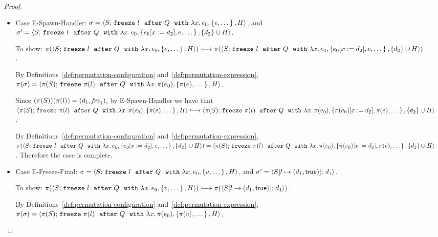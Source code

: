\begin{proof}
\begin{itemize}
    \item Case {\sc E-Spawn-Handler}: $\sigma =
      \langle S;\, \mbox{\texttt{freeze}}~l~~{\mbox{\texttt{after}}}~Q~~{\mbox{\texttt{with}}}~\lambda x.\,e_0, \left\{e,
            \dots\right\}, H \rangle$, and $\sigma' =
      \langle S;\, \mbox{\texttt{freeze}}~l~~{\mbox{\texttt{after}}}~Q~~{\mbox{\texttt{with}}}~\lambda x.\,e_0, \left\{e_0[x := d_2],
            e, \dots\right\}, \{d_2\}\cup H \rangle$.

      To show:
      $\pi(\config{S}{\freezeafterfull{l}{Q}{\lam{x}{e_0}}{\setof{e,
            \dots}}{H}}) \parstepsto
      \pi(\config{S}{\freezeafterfull{l}{Q}{\lam{x}{e_0}}{\setof{\subst{e_0}{x}{d_2},
            e, \dots}} {\{d_2\}\cup H}})$.

      By Definitions~\ref{def:permutation-configuration}
      and~\ref{def:permutation-expression}, $\pi(\sigma) =
      \langle \pi(S);\, \mbox{\texttt{freeze}}~\pi(l)~~{\mbox{\texttt{after}}}~Q~~{\mbox{\texttt{with}}}~\lambda x.\,\pi(e_0), \left\{\pi(e),
            \dots\right\}, H \rangle$.

      Since $(\pi(S))(\pi(l)) = (d_1, \mathit{frz}_1)$, by {\sc
        E-Spawn-Handler} we have that
      $\config{\pi(S)}{\freezeafterfull{\pi(l)}{Q}{\lam{x}{\pi(e_0)}}{\setof{\pi(e),
            \dots}}{H}} \parstepsto
      \config{\pi(S)}{\freezeafterfull{\pi(l)}{Q}{\lam{x}{\pi(e_0)}}{\setof{\subst{\pi(e_0)}{x}{d_2},
            \pi(e), \dots}} {\{d_2\}\cup H}}$.

      By Definitions~\ref{def:permutation-configuration}
      and~\ref{def:permutation-expression},
      $\pi(\langle S;\, \mbox{\texttt{freeze}}~l~~{\mbox{\texttt{after}}}~Q~~{\mbox{\texttt{with}}}~\lambda x.\,e_0, \left\{e_0[x := d_2],
            e, \dots\right\}, \{d_2\}\cup H \rangle) =
      \langle \pi(S);\, \mbox{\texttt{freeze}}~\pi(l)~~{\mbox{\texttt{after}}}~Q~~{\mbox{\texttt{with}}}~\lambda x.\,\pi(e_0), \left\{\pi(e_0)[x := d_2],
            \pi(e), \dots\right\}, \{d_2\}\cup H \rangle$.  Therefore the case is
      complete.

    \item Case {\sc E-Freeze-Final}: $\sigma =
      \langle S;\, \mbox{\texttt{freeze}}~l~~{\mbox{\texttt{after}}}~Q~~{\mbox{\texttt{with}}}~\lambda x.\,e_0, \left\{v,
            \dots\right\}, H \rangle$, and $\sigma' =
      \langle S[l \mapsto (d_1, \textsf{true})];\, d_1 \rangle$.

      To show:
      $\pi(\config{S}{\freezeafterfull{l}{Q}{\lam{x}{e_0}}{\setof{v,
            \dots}}{H}}) \parstepsto
      \pi(\config{\extS{S}{l}{d_1}{\frozentrue}}{d_1})$.

      By Definitions~\ref{def:permutation-configuration}
      and~\ref{def:permutation-expression}, $\pi(\sigma) =
      \langle \pi(S);\, \mbox{\texttt{freeze}}~\pi(l)~~{\mbox{\texttt{after}}}~Q~~{\mbox{\texttt{with}}}~\lambda x.\,\pi(e_0), \left\{\pi(v),
            \dots\right\}, H \rangle$.



\end{itemize}
\end{proof}
